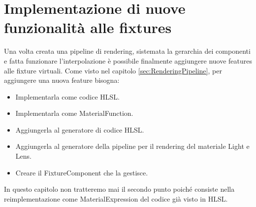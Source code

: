 \documentclass[main.tex]{subfiles}
\begin{document}
\sloppy


\vspace{1.0cm}

\section{Implementazione di nuove funzionalità alle fixtures}\label{sec:NewFeatures}
Una volta creata una pipeline di rendering, sistemata la gerarchia dei componenti e fatta funzionare l'interpolazione è possibile finalmente aggiungere nuove features alle fixture virtuali. Come visto nel capitolo \ref{sec:RenderingPipeline}, per aggiungere una nuova feature bisogna:
\begin{itemize}
	\item Implementarla come codice HLSL.
	\item Implementarla come MaterialFunction.
	\item Aggiungerla al generatore di codice HLSL.
	\item Aggiungerla al generatore della pipeline per il rendering del materiale Light e Lens.
    \item Creare il FixtureComponent che la gestisce.
\end{itemize}
In questo capitolo non tratteremo mai il secondo punto poiché consiste nella reimplementazione come MaterialExpression del codice già visto in HLSL.
\end{document}
